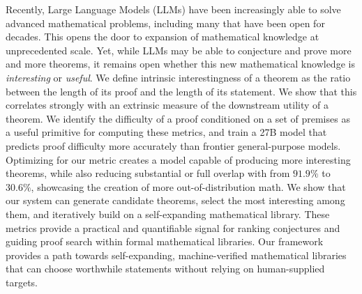 Recently, Large Language Models (LLMs) have been increasingly able to solve advanced mathematical problems, including many that have been open for decades.
%
This opens the door to expansion of mathematical knowledge at unprecedented scale.
%
Yet, while LLMs may be able to conjecture and prove more and more theorems, it remains open whether this new mathematical knowledge is \emph{interesting} or \emph{useful}.
We define intrinsic interestingness of a theorem as the ratio between the length of its proof and the length of its statement. We show that this correlates strongly with an extrinsic measure of the downstream utility of a theorem.
We identify the difficulty of a proof conditioned on a set of premises as a useful primitive for computing these metrics, and train a 27B model that predicts proof difficulty more accurately than frontier general-purpose models.
Optimizing for our metric creates a model capable of producing more interesting theorems, while also reducing substantial or full overlap with \Mathlib from $91.9\%$ to $30.6\%$, showcasing the creation of more out-of-distribution math.
We show that our system can generate candidate theorems, select the most interesting among them, and iteratively build on a self-expanding mathematical library.
These metrics provide a practical and quantifiable signal for ranking conjectures and guiding proof search within formal mathematical libraries.
Our framework provides a path towards self-expanding, machine-verified mathematical libraries that can choose worthwhile statements without relying on human-supplied targets.
